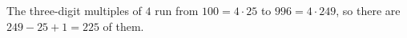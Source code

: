 The three-digit multiples of $4$ run from $100=4\cdot25$ to $996=4\cdot249$, so there are $249-25+1=\boxed{225}$ of them.
